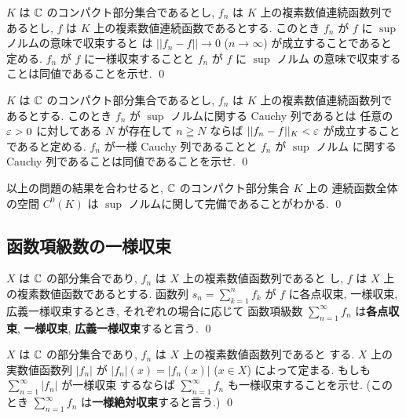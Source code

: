 \documentclass[12pt,twoside]{jarticle}
\begin{document}
\begin{question}
 $K$ は ${\mathbb C}$ のコンパクト部分集合であるとし, 
 $f_n$ は $K$ 上の複素数値連続函数列であるとし, 
 $f$ は $K$ 上の複素数値連続函数であるとする.
 このとき $f_n$ が $f$ に $\sup$ ノルムの意味で収束すると
 は $||f_n - f||\to 0$ ($n\to\infty$) が成立することであると定める.
 $f_n$ が $f$ に一様収束することと $f_n$ が $f$ に $\sup$ ノルム
 の意味で収束することは同値であることを示せ.
 \qed
\end{question}

\begin{question}
 $K$ は ${\mathbb C}$ のコンパクト部分集合であるとし, 
 $f_n$ は $K$ 上の複素数値連続函数列であるとする.
 このとき $f_n$ が $\sup$ ノルムに関する Cauchy 列であるとは
 任意の $\varepsilon>0$ に対してある $N$ が存在して $n\geqq N$
 ならば $||f_n-f||_K<\varepsilon$ が成立することであると定める.
 $f_n$ が一様 Cauchy 列であることと $f_n$ が $\sup$ ノルム
 に関する Cauchy 列であることは同値であることを示せ.
 \qed
\end{question}

\begin{guide}
 以上の問題の結果を合わせると, ${\mathbb C}$ のコンパクト部分集合 $K$ 上の
 連続函数全体の空間 $C^0(K)$ は $\sup$ ノルムに関して完備であることがわかる. 
 \qed
\end{guide}


\subsection{函数項級数の一様収束}

\begin{definition}[函数項級数の収束]
 $X$ は ${\mathbb C}$ の部分集合であり, $f_n$ は $X$ 上の複素数値函数列であると
 し, $f$ は $X$ 上の複素数値函数であるとする.
 函数列 $s_n=\sum_{k=1}^n f_k$ が $f$ に各点収束, 一様収束, 
 広義一様収束するとき, それぞれの場合に応じて
 函数項級数 $\sum_{n=1}^\infty f_n$ は{\bf 各点収束}, {\bf 一様収束}, 
 {\bf 広義一様収束}すると言う.
 \qed
\end{definition}

\begin{question}[一様絶対収束の定義]
 $X$ は ${\mathbb C}$ の部分集合であり, $f_n$ は $X$ 上の複素数値函数列であると
 する. $X$ 上の実数値函数列 $|f_n|$ が $|f_n|(x)=|f_n(x)|$ ($x\in X$) 
 によって定まる.  もしも $\sum_{n=1}^\infty|f_n|$ が一様収束
 するならば $\sum_{n=1}^\infty f_n$ も一様収束することを示せ.
 (このとき $\sum_{n=1}^\infty f_n$ は{\bf 一様絶対収束}すると言う.)
 \qed
\end{question}
\end{document}

